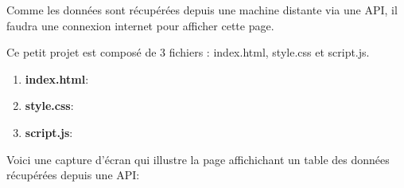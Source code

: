 \documentclass[a4paper,11pt]{article}
\begin{document}
            \bigskip
            \noindent Comme les données sont récupérées depuis une machine distante via une API, il faudra une connexion internet pour afficher cette page.
            
            \bigskip
            \noindent Ce petit projet est composé de 3 fichiers : index.html, style.css et script.js.

            \begin{enumerate}
                \item \textbf{index.html}:
                    

                \newpage
                \item \textbf{style.css}:
                    

                \newpage
                \item \textbf{script.js}:
                    
            \end{enumerate}
            
            \bigskip
            \noindent Voici une capture d'écran qui illustre la page affichichant un table des données récupérées depuis une API:
            
            \newpage
            \begin{figure}
            \end{figure}
\end{document}
